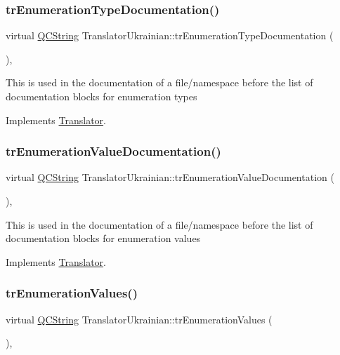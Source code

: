 \subsubsection{\texorpdfstring{trEnumerationTypeDocumentation()}{trEnumerationTypeDocumentation()}}
{\footnotesize\ttfamily virtual \mbox{\hyperlink{class_q_c_string}{Q\+C\+String}} Translator\+Ukrainian\+::tr\+Enumeration\+Type\+Documentation (\begin{DoxyParamCaption}{ }\end{DoxyParamCaption})\hspace{0.3cm}{\ttfamily [inline]}, {\ttfamily [virtual]}}

This is used in the documentation of a file/namespace before the list of documentation blocks for enumeration types 

Implements \mbox{\hyperlink{class_translator}{Translator}}.

\mbox{\label{class_translator_ukrainian_a44f81c1379feda3765e0f3aab42f7b44}} 
\subsubsection{\texorpdfstring{trEnumerationValueDocumentation()}{trEnumerationValueDocumentation()}}
{\footnotesize\ttfamily virtual \mbox{\hyperlink{class_q_c_string}{Q\+C\+String}} Translator\+Ukrainian\+::tr\+Enumeration\+Value\+Documentation (\begin{DoxyParamCaption}{ }\end{DoxyParamCaption})\hspace{0.3cm}{\ttfamily [inline]}, {\ttfamily [virtual]}}

This is used in the documentation of a file/namespace before the list of documentation blocks for enumeration values 

Implements \mbox{\hyperlink{class_translator}{Translator}}.

\mbox{\label{class_translator_ukrainian_afe3e5616bf49590ac2d70776105c81e7}} 
\subsubsection{\texorpdfstring{trEnumerationValues()}{trEnumerationValues()}}
{\footnotesize\ttfamily virtual \mbox{\hyperlink{class_q_c_string}{Q\+C\+String}} Translator\+Ukrainian\+::tr\+Enumeration\+Values (\begin{DoxyParamCaption}{ }\end{DoxyParamCaption})\hspace{0.3cm}{\ttfamily [inline]}, {\ttfamily [virtual]}}

